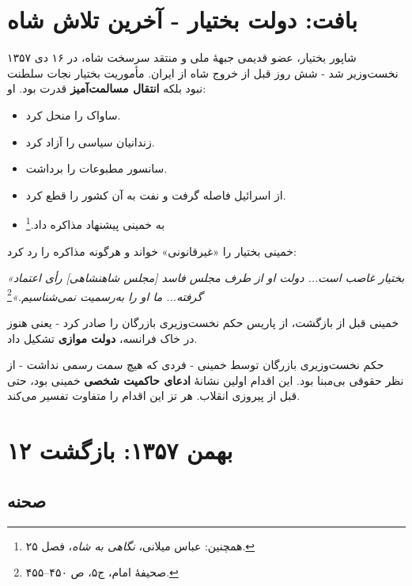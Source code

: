 \documentclass[12pt,a4paper]{book}
\newcommand{\keyword}[1]{\textbf{\textcolor{cPrimary}{#1}}}
\newcommand{\en}[1]{\lr{\textit{#1}}}
\begin{document}
\section{بافت: دولت بختیار - آخرین تلاش شاه}

شاپور بختیار، عضو قدیمی جبههٔ ملی و منتقد سرسخت شاه، در ۱۶ دی ۱۳۵۷ نخست‌وزیر شد - شش روز قبل از خروج شاه از ایران. مأموریت بختیار نجات سلطنت نبود بلکه \keyword{انتقال مسالمت‌آمیز} قدرت بود. او:

\begin{itemize}[label=\textcolor{cPrimary}{$\blacktriangleright$}, rightmargin=2em]
    \item ساواک را منحل کرد.
    \item زندانیان سیاسی را آزاد کرد.
    \item سانسور مطبوعات را برداشت.
    \item از اسرائیل فاصله گرفت و نفت به آن کشور را قطع کرد.
    \item به خمینی پیشنهاد مذاکره داد.\footnote{\en{Bakhash (1984), pp.\,35--48.} همچنین: عباس میلانی، \textit{نگاهی به شاه}، فصل ۲۵.}
\end{itemize}

\begin{warningBox}
خمینی بختیار را «غیرقانونی» خواند و هرگونه مذاکره را رد کرد:

\textit{«بختیار غاصب است... دولت او از طرف مجلس فاسد [مجلس شاهنشاهی] رأی اعتماد گرفته... ما او را به‌رسمیت نمی‌شناسیم.»}\footnote{صحیفهٔ امام، ج۵، ص ۴۵۰–۴۵۵.}

خمینی قبل از بازگشت، از پاریس حکم نخست‌وزیری بازرگان را صادر کرد - یعنی هنوز در خاک فرانسه، \keyword{دولت موازی} تشکیل داد.
\end{warningBox}

\begin{noteBox}
حکم نخست‌وزیری بازرگان توسط خمینی - فردی که هیچ سمت رسمی نداشت - از نظر حقوقی بی‌مبنا بود. این اقدام اولین نشانهٔ \keyword{ادعای حاکمیت شخصی} خمینی بود، حتی قبل از پیروزی انقلاب. هر تز این اقدام را متفاوت تفسیر می‌کند.
\end{noteBox}

\section{۱۲ بهمن ۱۳۵۷: بازگشت}

\subsection{صحنه}
\end{document}
